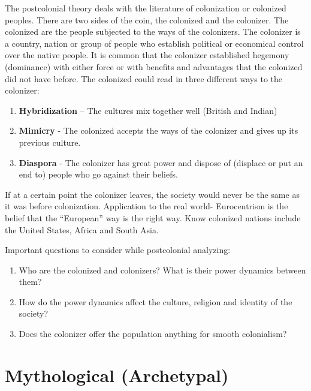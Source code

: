 \documentclass[11pt, twocolumn]{article}
\begin{document}
\begin{twocolumn}
The postcolonial theory deals with the literature of colonization or colonized peoples. There are two sides of the coin, the colonized and the colonizer. The colonized are the people subjected to the ways of the colonizers.
The colonizer is a country, nation or group of people who establish political or economical control over the native people. It is common that the colonizer established hegemony (dominance) with either force or with benefits and advantages that the colonized did not have before.
The colonized could read in three different ways to the colonizer:
\begin{enumerate}
        \item \textbf{Hybridization} – The cultures mix together well (British and Indian)
        \item \textbf{Mimicry} - The colonized accepts the ways of the colonizer and gives up its previous culture.
        \item \textbf{Diaspora} - The colonizer has great power and dispose of (displace or put an end to) people who go against their beliefs.
\end{enumerate}
If at a certain point the colonizer leaves, the society would never be the same as it was before colonization.
Application to the real world- Eurocentrism is the belief that the “European” way is the right way.
Know colonized nations include the United States, Africa and South Asia.

Important questions to consider while postcolonial analyzing: \\
\begin{enumerate}
        \item Who are the colonized and colonizers? What is their power dynamics between them?
        \item How do the power dynamics affect the culture, religion and identity of the society?
        \item Does the colonizer offer the population anything for smooth colonialism?
\end{enumerate}

\section{Mythological (Archetypal)}


\end{twocolumn}
\end{document}
